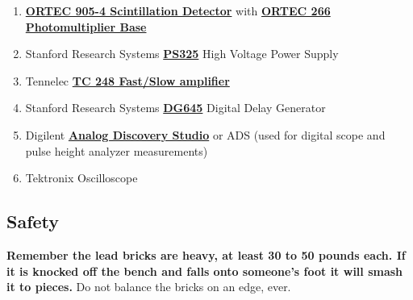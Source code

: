 \documentclass{../lab}
\begin{document}
\begin{enumerate}
    
    \item \href{https://drive.google.com/file/d/1Hf_LmTA6Bq4PDPHpI3Ux3wmfe61OZqrJ/view?usp=drive_link}{\textbf{ORTEC 905-4 Scintillation Detector}} with \href{https://drive.google.com/file/d/1w2nM4xpDyLj5RCMfyUWVf7PMapEULrlQ/view?usp=drive_link}{\textbf{ORTEC 266 Photomultiplier Base}}
    
    \item Stanford Research Systems  \href{https://drive.google.com/file/d/102ZDUKkjeEjn9zsKbq845126XYzioNHp/view?usp=drive_link}{\textbf{PS325}} High Voltage Power Supply


    \item Tennelec \href{https://groups.frib.msu.edu/nscl_library/manuals/tennelec/TC248.pdf}{\textbf{TC 248 Fast/Slow amplifier}}

    \item Stanford Research Systems  \href{https://drive.google.com/file/d/1PNLeiZvP4k50RJv1V8cbh_L-T2n2zmKE/view?usp=drive_link}{\textbf{DG645}} Digital Delay Generator


    \item Digilent \href{https://digilent.com/shop/analog-discovery-studio/}{\textbf{Analog Discovery Studio}} or ADS (used for digital scope and pulse height analyzer measurements)

    \item Tektronix Oscilloscope

\end{enumerate}

\subsection{Safety}

\textbf{Remember the lead bricks are heavy, at least 30 to 50 pounds each. If it is knocked off the bench and falls onto someone's foot it will smash it to pieces.} Do not balance the bricks on an edge, ever.
\end{document}

